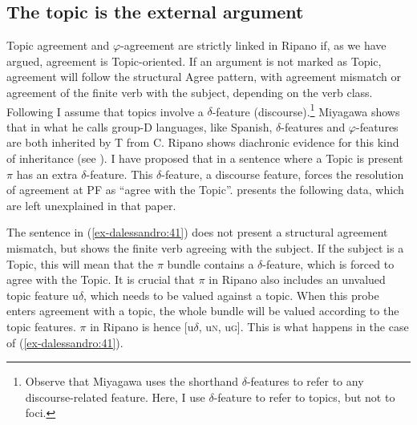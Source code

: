 \documentclass[output=paper
,modfonts
,nonflat]{langsci/langscibook}
\begin{document}
\subsection{The topic is the external argument}\label{sec-dalessandro:5.1}
Topic agreement and $\varphi $-agreement are strictly linked in Ripano if, as we have argued, agreement is Topic-oriented. If an argument is not marked as Topic, agreement will follow the structural Agree pattern, with agreement mismatch or agreement of the finite verb with the subject, depending on the verb class. Following \citet{Miyagawa2017} I assume that topics involve a $\delta $-feature (discourse).\footnote{Observe that Miyagawa uses the shorthand $\delta $-features to refer to any discourse-related feature. Here, I use $\delta $-feature to refer to topics, but not to foci.} Miyagawa shows that in what he calls group-D languages, like Spanish, $\delta $-features and $\varphi $-features are both inherited by T from C. Ripano shows diachronic evidence for this kind of inheritance (see ). 
I have proposed that in a sentence where a Topic is present $\pi $ has an extra $\delta $-feature. This $\delta $-feature, a discourse feature, forces the resolution of agreement at PF as “agree with the Topic”. \citet{D`Alessandro2017} presents the following data, which are left unexplained in that paper.

\begin{exe}
\judgewidth{*/$\#$}
 \label{ex-dalessandro:41}
\end{exe}
The sentence in (\ref{ex-dalessandro:41}) does not present a structural agreement mismatch, but shows the finite verb agreeing with the subject. If the subject is a Topic, this will mean that the $\pi $ bundle contains a $\delta $-feature, which is forced to agree with the Topic. 
It is crucial that $\pi $ in Ripano also includes an unvalued topic feature u$\delta $, which needs to be valued against a topic. When this probe enters agreement with a topic, the whole bundle will be valued according to the topic features. $\pi $ in Ripano is hence [u$\delta $, u\textsc{n,} u\textsc{g].} This is what happens in the case of (\ref{ex-dalessandro:41}).
\end{document}
